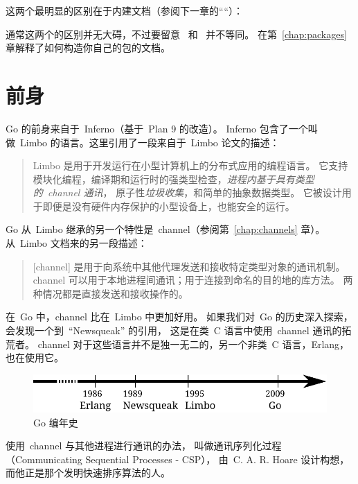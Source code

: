 这两个最明显的区别在于内建文档（参阅下一章的````）：
\begin{display}
\pr {}   
\pr {}    
\end{display}

通常这两个的区别并无大碍，不过要留意~ 和~ 并不等同。
在第~\ref{chap:packages} 章解释了如何构造你自己的包的文档。

\section{前身}
Go 的前身来自于~Inferno\cite{inferno}（基于~Plan 9\cite{plan9} 的改造）。
Inferno 包含了一个叫做~Limbo\cite{limbo} 的语言。这里引用了一段来自于~Limbo 论文的描述：
\begin{quote}
Limbo 是用于开发运行在小型计算机上的分布式应用的编程语言。
它支持模块化编程，编译期和运行时的强类型检查，\emph{进程内基于具有类型的~channel 通讯}，
原子性\emph{垃圾收集}，和简单的抽象数据类型。
它被设计用于即便是没有硬件内存保护的小型设备上，也能安全的运行。
\end{quote}
Go 从~Limbo 继承的另一个特性是~channel（参阅第~\ref{chap:channels} 章）。
从~Limbo 文档来的另一段描述：
\begin{quote}
[channel] 是用于向系统中其他代理发送和接收特定类型对象的通讯机制。
channel 可以用于本地进程间通讯；用于连接到命名的目的地的库方法。
两种情况都是直接发送和接收操作的。
\end{quote}
在~Go 中，channel 比在~Limbo 中更加好用。
如果我们对~Go 的历史深入探索，会发现一个到~``Newsqueak''\cite{newsqueak} 的引用，
这是在类~C 语言中使用~channel 通讯的拓荒者。
channel 对于这些语言并不是独一无二的，另一个非类~C 语言，Erlang\cite{erlang}，也在使用它。

\begin{figure}[H]
\caption{Go 编年史}
\label{fig:chrono-of-go}
\begin{center}
\includegraphics[scale=0.65]{fig/go-history.pdf}
\end{center}
\end{figure}

使用~channel 与其他进程进行通讯的办法，
叫做通讯序列化过程（Communicating Sequential Processes - CSP），
由~C. A. R. Hoare\cite{hoare} 设计构想，而他正是那个发明快速排序\cite{quicksort}算法的人。

